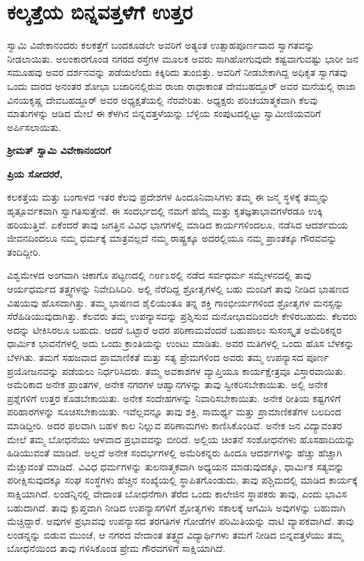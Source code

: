 
\chapter{ಕಲ್ಕತ್ತೆಯ ಬಿನ್ನವತ್ತಳೆಗೆ ಉತ್ತರ}

ಸ್ವಾಮಿ ವಿವೇಕಾನಂದರು ಕಲಕತ್ತೆಗೆ ಬಂದಕೂಡಲೇ ಅವರಿಗೆ ಅತ್ಯಂತ ಉತ್ಸಾಹಪೂರ್ಣವಾದ ಸ್ವಾಗತವನ್ನು ನೀಡಲಾಯಿತು. ಅಲಂಕಾರಗೊಂಡ ನಗರದ ರಸ್ತೆಗಳ ಮೂಲಕ ಅವರು ಸಾಗಿಹೋಗುವುದೇ ಕಷ್ಟವಾಗುವಷ್ಟು ಭಾರೀ ಜನ ಸಮೂಹವು ಅವರ ದರ್ಶನವನ್ನು ಪಡೆಯಲೆಂದು ಕಿಕ್ಕಿರಿದು ತುಂಬಿತ್ತು. ಅವರಿಗೆ ನೀಡಬೇಕಾಗಿದ್ದ ಅಧಿಕೃತ ಸ್ವಾಗತವು ಒಂದು ವಾರದ ಅನಂತರ ಶೋಭಾ ಬಜಾರಿನಲ್ಲಿರುವ ರಾಜಾ ರಾಧಾಕಾಂತ ದೇವಬಹದ್ದೂರ್​ ಅವರ ಮನೆಯಲ್ಲಿ ರಾಜಾ ವಿನಯಕೃಷ್ಣ ದೇವಬಹದ್ದೂರ್​ ಅವರ ಅಧ್ಯಕ್ಷತೆಯಲ್ಲಿ ನೆರವೇರಿತು. ಅಧ್ಯಕ್ಷರು ಪರಿಚಯಾತ್ಮಕವಾಗಿ ಕೆಲವು ಮಾತುಗಳನ್ನು ಆಡಿದ ಮೇಲೆ ಈ ಕೆಳಗಿನ ಬಿನ್ನವತ್ತಳೆಯನ್ನು ಬೆಳ್ಳಿಯ ಸಂಪುಟದಲ್ಲಿಟ್ಟು ಸ್ವಾಮೀಜಿಯವರಿಗೆ ಅರ್ಪಿಸಲಾಯಿತು.

\textbf{ಶ‍್ರೀಮತ್​ ಸ್ವಾಮಿ ವಿವೇಕಾನಂದರಿಗೆ}

\textbf{ಪ್ರಿಯ ಸೋದರರೆ,}

ಕಲಕತ್ತೆಯ ಮತ್ತು ಬಂಗಾಳದ ಇತರ ಕೆಲವು ಪ್ರದೇಶಗಳ ಹಿಂದೂನಿವಾಸಿಗಳು ತಮ್ಮ ಈ ಜನ್ಮ ಸ್ಥಳಕ್ಕೆ ತಮ್ಮನ್ನು ಹೃತ್ಪೂರ್ವಕವಾಗಿ ಸ್ವಾಗತಿಸುತ್ತೇವೆ. ಈ ಸಂದರ್ಭದಲ್ಲಿ ನಮಗೆ ಹೆಮ್ಮೆ ಮತ್ತು ಕೃತಜ್ಞತಾಭಾವಗಳೆರಡೂ ಉಕ್ಕಿ ಹರಿಯುತ್ತಿವೆ. ಏಕೆಂದರೆ ತಾವು ಜಗತ್ತಿನ ವಿವಿಧ ಭಾಗಗಳಲ್ಲಿ ಮಾಡಿದ ಕಾರ್ಯಗಳಿಂದಲೂ, ನಡೆಸಿದ ಆದರ್ಶಮಯ ಜೀವನದಿಂದಲೂ ನಮ್ಮ ಧರ್ಮಕ್ಕೆ ಮಾತ್ರವಲ್ಲದೆ ನಮ್ಮ ರಾಷ್ಟ್ರಕ್ಕೂ ಅದರಲ್ಲಿಯೂ ನಮ್ಮ ಪ್ರಾಂತಕ್ಕೂ ಗೌರವವನ್ನು ತಂದಿದ್ದೀರಿ.

ವಿಶ್ವಮೇಳದ ಅಂಗವಾಗಿ ಚಿಕಾಗೊ ಪಟ್ಟಣದಲ್ಲಿ ೧೮೯೩ರಲ್ಲಿ ನಡೆದ ಸರ್ವಧರ್ಮ ಸಮ್ಮೇಳನದಲ್ಲಿ ತಾವು ಆರ್ಯಧರ್ಮದ ತತ್ತ್ವಗಳನ್ನು ನಿವೇದಿಸಿದಿರಿ. ಅಲ್ಲಿ ನೆರೆದಿದ್ದ ಶ್ರೋತೃಗಳಲ್ಲಿ ಬಹು ಮಂದಿಗೆ ತಾವು ನೀಡಿದ ಭಾಷಣದ ವಿಷಯವು ಹೊಸದಾಗಿತ್ತು. ತಮ್ಮ ಭಾಷಣದ ಶೈಲಿಯಂತೂ ತನ್ನ ಶಕ್ತಿ ಗಾಂಭೀರ್ಯಗಳಿಂದ ಶ್ರೋತೃಗಳ ಮನಸ್ಸನ್ನು ಸೆರೆಹಿಡಿಯುವುದಾಗಿತ್ತು. ಕೆಲವರು ತಮ್ಮ ಉಪನ್ಯಾಸವನ್ನು ಪ್ರಶ್ನಿಸುವ ಮನೋಭಾವದಿಂದಲೇ ಕೇಳಿರಬಹುದು. ಕೆಲವರು ಅದನ್ನು ಟೀಕಿಸಿರಲೂ ಬಹುದು. ಆದರೆ ಒಟ್ಟಾರೆ ಅದರ ಪರಿಣಾಮವೆಂದರೆ ಬಹುಪಾಲು ಸುಸಂಸ್ಕೃತ ಅಮೆರಿಕನ್ನರ ಧಾರ್ಮಿಕ ಭಾವನೆಗಳಲ್ಲಿ ಅದು ಒಂದು ಕ್ರಾಂತಿಯನ್ನು ಉಂಟು ಮಾಡಿತು. ಅವರ ಮತಿಗಳಲ್ಲಿ ಒಂದು ಹೊಸ ಬೆಳಕನ್ನು ಬೆಳಗಿತು. ತಮಗೆ ಸಹಜವಾದ ಪ್ರಾಮಾಣಿಕತೆ ಮತ್ತು ಸತ್ಯ ಪ್ರೇಮಗಳಿಂದ ಅವರು ತಮ್ಮ ಉಪನ್ಯಾಸದ ಪೂರ್ಣ ಪ್ರಯೋಜನವನ್ನು ಪಡೆಯಲು ನಿರ್ಧರಿಸಿದರು. ತಮ್ಮ ಅವಕಾಶಗಳ ವ್ಯಾಪ್ತಿಯೂ ಕಾರ್ಯಕ್ಷೇತ್ರವೂ ವಿಸ್ತಾರವಾಯಿತು. ಅಮೆರಿಕಾದ ಅನೇಕ ಪ್ರಾಂತಗಳ, ಅನೇಕ ನಗರಗಳ ಆಹ್ವಾನಗಳನ್ನು ತಾವು ಸ್ವೀಕರಿಸಬೇಕಾಯಿತು. ಅಲ್ಲಿ ಅನೇಕ ಪ್ರಶ್ನೆಗಳಿಗೆ ಉತ್ತರ ಕೊಡಬೇಕಾಯಿತು. ಅನೇಕ ಸಂದೇಹಗಳನ್ನು ನಿವಾರಿಸಬೇಕಾಯಿತು. ಅನೇಕ ರೀತಿಯ ಕಷ್ಟಗಳಿಗೆ ಪರಿಹಾರಗಳನ್ನು ಸೂಚಿಸಬೇಕಾಯಿತು. ಇವೆಲ್ಲವನ್ನೂ ತಾವು ಶಕ್ತಿ, ಸಾಮರ್ಥ್ಯ ಮತ್ತು ಪ್ರಾಮಾಣಿಕತೆಗಳ ಬಲದಿಂದ ಮಾಡಿದ್ದೀರಿ. ಅದರ ಫಲವಾಗಿ ಬಹಳ ಕಾಲ ನಿಲ್ಲುವ ಪರಿಣಾಮಗಳು ಕಾಣಿಸಿಕೊಂಡಿವೆ. ಅನೇಕ ಜನ ವಿದ್ಯಾವಂತರ ಮೇಲೆ ತಮ್ಮ ಬೋಧನೆಯು ಆಳವಾದ ಪ್ರಭಾವವನ್ನು ಬೀರಿದೆ. ಅಲ್ಲಿಯ ಚಿಂತನೆ ಸಂಶೋಧನೆಗಳು ಹೊಸಹಾದಿಯನ್ನು ಹಿಡಿಯುವಂತೆ ಮಾಡಿದೆ. ಅಲ್ಲದೆ ಅನೇಕ ಸಂದರ್ಭಗಳಲ್ಲಿ ಅಮೆರಿಕನ್ನರು ಹಿಂದೂ ಆದರ್ಶಗಳನ್ನು ಹೆಚ್ಚು ಹೆಚ್ಚಾಗಿ ಮೆಚ್ಚುವಂತೆ ಮಾಡಿದೆ. ವಿವಿಧ ಧರ್ಮಗಳನ್ನು ತುಲನಾತ್ಮಕವಾಗಿ ಅಧ್ಯಯನ ಮಾಡುವುದಕ್ಕೂ, ಧಾರ್ಮಿಕ ಸತ್ಯವನ್ನು ಪರೀಕ್ಷಿಸುವುದಕ್ಕೂ ಸಂಘ ಸಂಸ್ಥೆಗಳು ಹೆಚ್ಚಿನ ಸಂಖ್ಯೆಯಲ್ಲಿ ಸ್ಥಾಪಿತಗೊಂಡುದು, ತಾವು ಪಶ್ಚಿಮದಲ್ಲಿ ಮಾಡಿದ ಕಾರ್ಯಕ್ಕೆ ಸಾಕ್ಷಿಯಾಗಿದೆ. ಲಂಡನ್ನಿನಲ್ಲಿ ವೇದಾಂತ ಬೋಧನೆಗಾಗಿ ತೆರೆದ ಒಂದು ಕಾಲೇಜಿನ ಸ್ಥಾಪಕರು ತಾವು, ಎಂದು ಭಾವಿಸ ಬಹುದಾಗಿದೆ. ತಾವು ಕ್ಲುಪ್ತವಾಗಿ ನೀಡಿದ ಉಪನ್ಯಾಸಗಳಿಗೆ ಶ್ರೋತೃಗಳು ಸಕಾಲಕ್ಕೆ ಆಗಮಿಸಿ ಅವುಗಳನ್ನು ಬಹುವಾಗಿ ಮೆಚ್ಚಿದ್ದಾರೆ. ಅವುಗಳ ಪ್ರಭಾವವು ಉಪನ್ಯಾಸದ ತರಗತಿಗಳ ಗೋಡೆಗಳ ಪರಿಮಿತಿಯನ್ನು ದಾಟಿ ವ್ಯಾಪಕವಾಗಿದೆ. ತಾವು ಲಂಡನ್ನನ್ನು ಬಿಡುವ ಮುಂಚೆ, ಆ ನಗರದ ವೇದಾಂತ ತತ್ತ್ವದ ವಿದ್ಯಾರ್ಥಿಗಳು ತಮಗೆ ನೀಡಿದ ಬಿನ್ನವತ್ತಳೆಯು ತಮ್ಮ ಬೋಧನೆಯಿಂದ ತಾವು ಗಳಿಸಿಕೊಂಡ ಪ್ರೇಮ ಗೌರವಗಳಿಗೆ ಸಾಕ್ಷಿಯಾಗಿದೆ.


